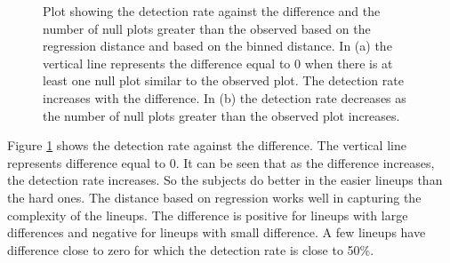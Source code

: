 \documentclass[12]{article}
\begin{document}
\begin{figure}[hbtp]
\centering
{}
	\vspace{-.1in}
\caption[Optional caption for list of figures]{Plot showing the detection rate against the difference and the number of null plots greater than the observed based on the regression distance and based on the binned distance. In (a) the vertical line represents the difference equal to 0 when there is at least one null plot similar to the observed plot. The detection rate increases with the difference.  In (b) the detection rate decreases as the number of null plots greater than the observed plot increases.}
\label{turk2comp}
\end{figure}

Figure \ref{turk2comp} shows the detection rate against the difference. The vertical line represents difference equal to 0. It can be seen that as the difference increases, the detection rate increases. So the subjects do better in the easier lineups than the hard ones. The distance based on regression works well in capturing the complexity of the lineups. The difference is positive for lineups with large differences and negative for lineups with small difference. A few lineups have difference close to zero for which the detection rate is close to 50\%.
\end{document}
